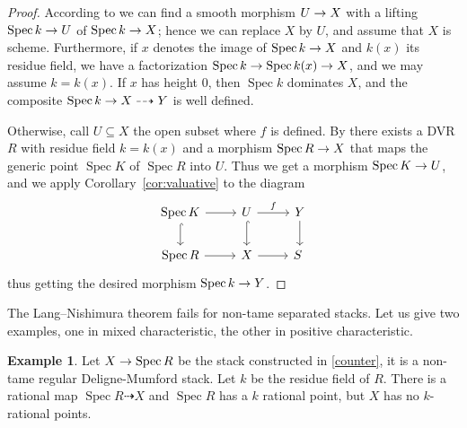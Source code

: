 \documentclass{amsart}
\numberwithin{equation}{section}
\numberwithin{subsection}{section}
\theoremstyle{definition}
\newtheorem{example}[theorem]{Example}
\theoremstyle{remark}
\newcommand\arr{\ifinner\to\else\longrightarrow\fi}
\newcommand\spec{\operatorname{Spec}}
\begin{document}
	\begin{proof}
		According to \cite[Thorme~6.3]{laumon-moret-bailly} we can find a smooth morphism $U \arr X$ with a lifting $\spec k \arr U$ of $\spec k \arr X$; hence we can replace $X$ by $U$, and assume that $X$ is scheme. Furthermore, if $x$ denotes the image of $\spec k \arr X$ and $k(x)$ its residue field, we have a factorization $\spec k \arr \spec k(x) \arr X$, and we may assume $k = k(x)$. If $x$ has height $0$, then $\spec k$ dominates $X$, and the composite $\spec k \arr X \dashrightarrow Y$ is well defined.
		
		Otherwise, call $U \subseteq X$ the open subset where $f$ is defined. By \cite[Lemma 4.3]{giulio-angelo-genericity} there exists a DVR $R$ with residue field $k = k(x)$ and a morphism $\spec R \arr X$ that maps the generic point $\spec K$ of $\spec R$ into $U$. Thus we get a morphism $\spec K \arr U$, and we apply Corollary~\ref{cor:valuative} to the diagram
		   \[
   \begin{tikzcd}
   \spec K \rar\dar[hook] & U \dar[hook]\rar["f"] & Y \dar\\
   \spec R \rar & X \rar & S\
   \end{tikzcd}
   \]
thus getting the desired morphism $\spec k \arr Y$.
	\end{proof}

The Lang--Nishimura theorem fails for non-tame separated stacks. Let us give two examples, one in mixed characteristic, the other in positive characteristic.

\begin{example}\label{counterLN}
Let $X \arr \spec R$ be the stack constructed in \ref{counter}, it is a non-tame regular Deligne-Mumford stack. Let $k$ be the residue field of $R$. There is a rational map $\spec R\dashrightarrow X$ and $\spec R$ has a $k$ rational point, but $X$ has no $k$-rational points.
\end{example}
\end{document}
